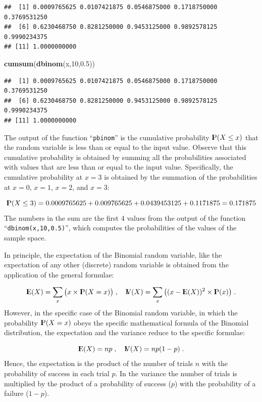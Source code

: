 \documentclass[]{krantz}
\makeatletter
\newenvironment{Shaded}{\begin{snugshade}}{\end{snugshade}}
\newcommand{\KeywordTok}[1]{\textcolor[rgb]{0.13,0.29,0.53}{\textbf{#1}}}
\newcommand{\DecValTok}[1]{\textcolor[rgb]{0.00,0.00,0.81}{#1}}
\newcommand{\FloatTok}[1]{\textcolor[rgb]{0.00,0.00,0.81}{#1}}
\newcommand{\NormalTok}[1]{#1}
\newcommand{\Expec}{{\rm I\kern-.3em E}}
\newcommand{\Prob}{{\rm I\kern-.3em P}}
\newcommand{\Var}{{\rm I\kern-.3em V}}
\newenvironment{kframe}{%
\medskip{}
\setlength{\fboxsep}{.8em}
 \def\at@end@of@kframe{}%
 \ifinner\ifhmode%
  \def\at@end@of@kframe{\end{minipage}}%
  \begin{minipage}{\columnwidth}%
 \fi\fi%
 \def\FrameCommand##1{\hskip\@totalleftmargin \hskip-\fboxsep
 \colorbox{shadecolor}{##1}\hskip-\fboxsep
     \hskip-\linewidth \hskip-\@totalleftmargin \hskip\columnwidth}%
 \MakeFramed {\advance\hsize-\width
   \@totalleftmargin\z@ \linewidth\hsize
   \@setminipage}}%
 {\par\unskip\endMakeFramed%
 \at@end@of@kframe}
\renewenvironment{Shaded}{\begin{kframe}}{\end{kframe}}
\theoremstyle{definition}
\theoremstyle{definition}
\theoremstyle{definition}
\theoremstyle{remark}
\makeatother
\begin{document}
\begin{verbatim}
##  [1] 0.0009765625 0.0107421875 0.0546875000 0.1718750000 0.3769531250
##  [6] 0.6230468750 0.8281250000 0.9453125000 0.9892578125 0.9990234375
## [11] 1.0000000000
\end{verbatim}

\begin{Shaded}
\begin{Highlighting}[]
\KeywordTok{cumsum}\NormalTok{(}\KeywordTok{dbinom}\NormalTok{(x,}\DecValTok{10}\NormalTok{,}\FloatTok{0.5}\NormalTok{))}
\end{Highlighting}
\end{Shaded}

\begin{verbatim}
##  [1] 0.0009765625 0.0107421875 0.0546875000 0.1718750000 0.3769531250
##  [6] 0.6230468750 0.8281250000 0.9453125000 0.9892578125 0.9990234375
## [11] 1.0000000000
\end{verbatim}

The output of the function ``\texttt{pbinom}'' is the cumulative
probability \(\Prob(X \leq x)\) that the random variable is less than or
equal to the input value. Observe that this cumulative probability is
obtained by summing all the probabilities associated with values that
are less than or equal to the input value. Specifically, the cumulative
probability at \(x=3\) is obtained by the summation of the probabilities
at \(x=0\), \(x=1\), \(x=2\), and \(x=3\):

\[\Prob(X \leq 3) = 0.0009765625 + 0.009765625 + 0.0439453125 + 0.1171875 = 0.171875\]
The numbers in the sum are the first 4 values from the output of the
function ``\texttt{dbinom(x,10,0.5)}'', which computes the probabilities
of the values of the sample space.

In principle, the expectation of the Binomial random variable, like the
expectation of any other (discrete) random variable is obtained from the
application of the general formulae:

\[\Expec(X) = \sum_x \big(x \times \Prob(X = x)\big)\;,\quad \Var(X) = \sum_x\big( (x-\Expec(X))^2 \times \Prob(x)\big)\;.\]
However, in the specific case of the Binomial random variable, in which
the probability \(\Prob(X = x)\) obeys the specific mathematical formula
of the Binomial distribution, the expectation and the variance reduce to
the specific formulae:

\[\Expec(X) = n p\;,\quad \Var(X) = n p(1-p)\;.\] Hence, the expectation
is the product of the number of trials \(n\) with the probability of
success in each trial \(p\). In the variance the number of trials is
multiplied by the product of a probability of success (\(p\)) with the
probability of a failure (\(1-p\)).
\end{document}
